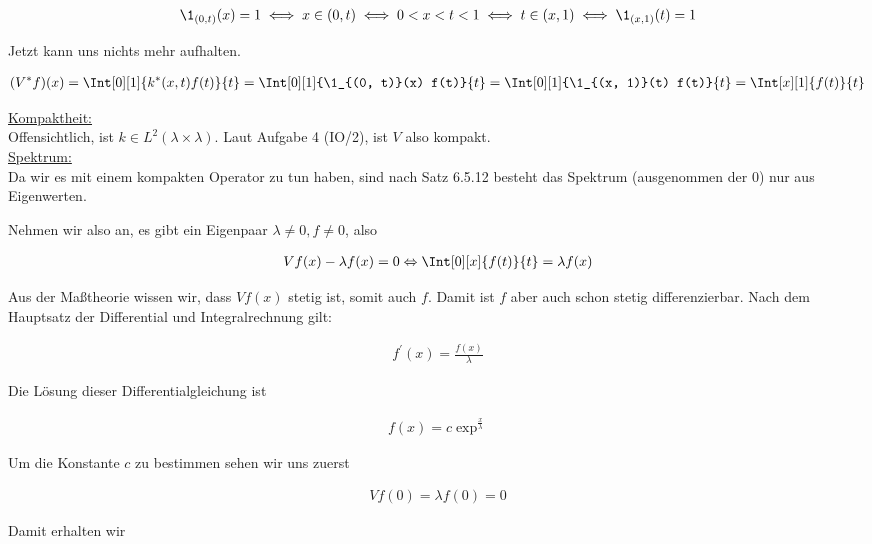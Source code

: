\begin{solution}
\begin{align*}
  \1_{(0, t)}(x) = 1
  \iff
  x \in (0, t)
  \iff
  0 < x < t < 1
  \iff
  t \in (x, 1)
  \iff
  \1_{(x, 1)}(t) = 1
\end{align*}

Jetzt kann uns nichts mehr aufhalten.

\begin{align*}
  (V^\ast f)(x)
  =
  \Int[0][1]{k^\ast(x, t) f(t)}{t}
  =
  \Int[0][1]{\1_{(0, t)}(x) f(t)}{t}
  =
  \Int[0][1]{\1_{(x, 1)}(t) f(t)}{t}
  =
  \Int[x][1]{f(t)}{t}
\end{align*}

\underline{Kompaktheit:} \\

Offensichtlich, ist $k \in L^2(\lambda \times \lambda)$.
Laut Aufgabe 4 (IO/2), ist $V$ also kompakt. \\

\underline{Spektrum:} \\

Da wir es mit einem kompakten Operator zu tun haben, sind nach Satz 6.5.12 besteht
das Spektrum (ausgenommen der $0$) nur aus Eigenwerten.

Nehmen wir also an, es gibt ein Eigenpaar $\lambda \neq 0, f \neq 0$, also

\begin{align*}
  Vf(x) - \lambda f(x) = 0
  \Leftrightarrow
  \Int[0][x]{f(t)}{t} = \lambda f(x)
\end{align*}

Aus der Maßtheorie wissen wir, dass $Vf(x)$ stetig ist, somit auch $f$. Damit ist
$f$ aber auch schon stetig differenzierbar. Nach dem Hauptsatz der Differential und
Integralrechnung gilt:

\begin{align*}
  f^\prime (x)
  =
  \frac{f(x)}{\lambda}
\end{align*}

Die Lösung dieser Differentialgleichung ist

\begin{align*}
  f(x)
  =
  c \exp^{\frac{x}{\lambda}}
\end{align*}

Um die Konstante $c$ zu bestimmen sehen wir uns zuerst

\begin{align*}
  Vf(0) = \lambda f(0) = 0
\end{align*}

Damit erhalten wir


\end{solution}
